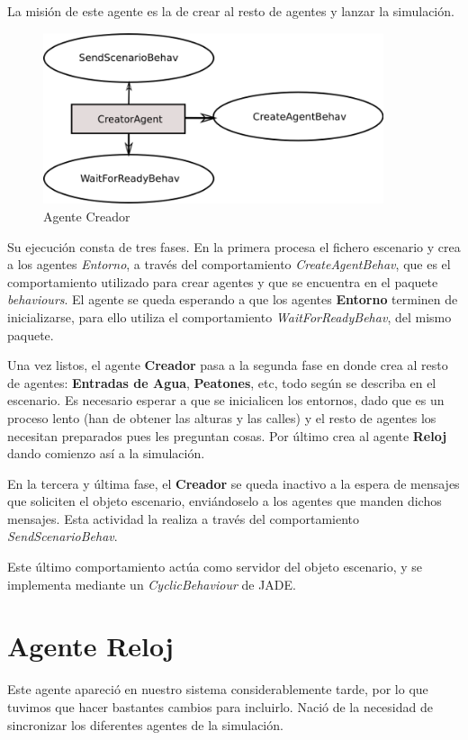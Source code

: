 La misión de este agente es la de crear al resto de agentes y lanzar la
simulación.

\begin{figure}[H]
 \centering
 \includegraphics[width=100mm]{figuras/cap5/ag_creator.png}
 \caption{Agente Creador}
\end{figure}

Su ejecución consta de tres fases. En la primera procesa el fichero escenario y
crea a los agentes {\em Entorno}, a través del comportamiento {\em
CreateAgentBehav}, que es el comportamiento utilizado para crear agentes y que
se encuentra en el paquete {\em behaviours}. El agente se queda esperando a que
los agentes {\bf Entorno} terminen de inicializarse, para ello utiliza el
comportamiento {\em WaitForReadyBehav}, del mismo paquete.

Una vez listos, el agente {\bf Creador} pasa a la segunda fase en donde crea al
resto de agentes: {\bf Entradas de Agua}, {\bf Peatones}, etc, todo según se
describa en el escenario. Es necesario esperar a que se inicialicen los
entornos, dado que es un proceso lento (han de obtener las alturas y las
calles) y el resto de agentes los necesitan preparados pues les preguntan cosas.
Por último crea al agente {\bf Reloj} dando comienzo así a la simulación.

En la tercera y última fase, el {\bf Creador} se queda inactivo a la espera de
mensajes que soliciten el objeto escenario, enviándoselo a los agentes que
manden dichos mensajes. Esta actividad la realiza a través del comportamiento
{\em SendScenarioBehav}.

Este último comportamiento actúa como servidor del objeto escenario, y se
implementa mediante un {\em CyclicBehaviour} de JADE.

\section*{Agente Reloj}

Este agente apareció en nuestro sistema considerablemente tarde, por lo que
tuvimos que hacer bastantes cambios para incluirlo. Nació de la necesidad de
sincronizar los diferentes agentes de la simulación.

